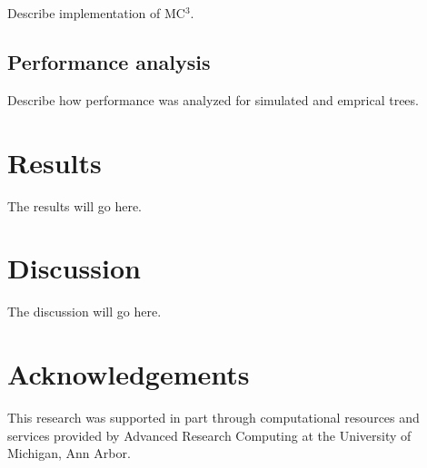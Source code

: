 \documentclass[12pt]{article}
\begin{document}
Describe implementation of MC$^{3}$.


\subsection*{Performance analysis}

Describe how performance was analyzed for simulated and emprical trees.


\section*{Results}

The results will go here.


\section*{Discussion}

The discussion will go here.


\section*{Acknowledgements}

This research was supported in part through computational resources
and services provided by Advanced Research Computing
at the University of Michigan, Ann Arbor.
\end{document}
